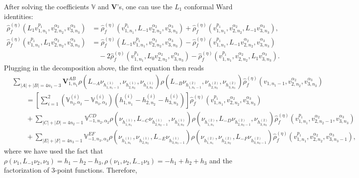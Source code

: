 \documentclass[12pt]{article}
\newcommand{\ie}{\begin{equation}\begin{aligned}}
\newcommand{\fe}{\end{aligned}\end{equation}}
\numberwithin{equation}{section}
\begin{document}
After solving the coefficients $\mathbb{V}$ and $\mathbf{V}$'s, one can use the $L_1$ conformal Ward identities:
\ie
\hat{\rho}_f^{(\eta)}(L_1v^{p_1}_{1,n_1},v_{2,n_2}^{\alpha_2},v_{3,n_3}^{\alpha_3})&=\hat{\rho}_f^{(\eta)}(v^{p_1}_{1,n_1},L_{-1}v_{2,n_2}^{\alpha_2},v_{3,n_3}^{\alpha_3})+\hat{\rho}_f^{(\eta)}(v^{p_1}_{1,n_1},v_{2,n_2}^{\alpha_2},L_{-1}v_{3,n_3}^{\alpha_3}),\\
\hat{\rho}_f^{(\eta)}(v^{p_1}_{1,n_1},L_1v_{2,n_2}^{\alpha_2},v_{3,n_3}^{\alpha_3})&=\hat{\rho}_f^{(\eta)}(L_{-1}v^{p_1}_{1,n_1},v_{2,n_2}^{\alpha_2},v_{3,n_3}^{\alpha_3})-\hat{\rho}_f^{(\eta)}(v^{p_1}_{1,n_1},L_{-1}v_{2,n_2}^{\alpha_2},v_{3,n_3}^{\alpha_3})\\
&\quad -2\hat{\rho}_f^{(\eta)}(v^{p_1}_{1,n_1},L_0v_{2,n_2}^{\alpha_2},v_{3,n_3}^{\alpha_3})-\hat{\rho}_f^{(\eta)}(v^{p_1}_{1,n_1},v_{2,n_2}^{\alpha_2},L_1v_{3,n_3}^{\alpha_3}). 
\fe
Plugging in the decomposition above, the first equation then reads
\ie
&\sum_{|A|+|B|=4n_1-3}\mathbf{V}_{1,n_1}^{AB}\rho(L_{-A}\nu_{h_{1,n_1-1}^{(1)}}, \nu_{h_{2,n_2}^{(1)}}, \nu_{h_{3,n_3}^{(1)}})\rho(L_{-B}\nu_{h_{1,n_1-1}^{(2)}}, \nu_{h_{2,n_2}^{(2)}}, \nu_{h_{3,n_3}^{(2)}})\hat{\rho}_f^{(\eta)}(v_{1,n_1-1},v_{2,n_2}^{\alpha_2},v_{3,n_3}^{\alpha_3})\\
&\qquad = \left[\sum_{i=1}^2 (\mathbb{V}_{n_2,\alpha_2}^{(i)}-\mathbb{V}_{n_3,\alpha_3}^{(i)})(h_{1,n_1}^{(i)}-h_{2,n_2}^{(i)}-h_{3,n_3}^{(i)})\right]\hat{\rho}_f^{(\eta)}(v^{p_1}_{1,n_1}, v_{2, n_2}^{\alpha_2}, v_{3, n_3}^{\alpha_3})\\
&\qquad + \sum_{|C|+|D|=4n_2-1} \mathbb{V}_{-1,n_2, \alpha_2}^{CD}\rho(\nu_{h_{1,n_1}^{(1)}},L_{-C}\nu_{h_{2,n_2-1}^{(1)}}, \nu_{h_{3,n_3}^{(1)}})\rho(\nu_{h_{1,n_1}^{(2)}},L_{-D}\nu_{h_{2,n_2-1}^{(2)}}, \nu_{h_{3,n_3}^{(2)}})\hat{\rho}_f^{(\eta)}(v^{p_1}_{1,n_1},v_{2,n_2-1}^{\alpha_2},v_{3,n_3}^{\alpha_3})\\
&\qquad + \sum_{|E|+|F|=4n_3-1} \mathbb{V}_{-1,n_3, \alpha_3}^{EF}\rho(\nu_{h_{1,n_1}^{(1)}},\nu_{h_{2,n_2}^{(1)}}, L_{-E}\nu_{h_{3,n_3-1}^{(1)}})\rho(\nu_{h_{1,n_1}^{(2)}},\nu_{h_{2,n_2}^{(2)}}, L_{-F}\nu_{h_{3,n_3-1}^{(2)}})\hat{\rho}_f^{(\eta)}(v^{p_1}_{1,n_1},v_{2,n_2}^{\alpha_2},v_{3,n_3-1}^{\alpha_3}),
\fe
where we have used the fact that $\rho(\nu_1,L_{-1}\nu_2,\nu_3)=h_1-h_2-h_3,\rho(\nu_1,\nu_2,L_{-1}\nu_3)=-h_1+h_2+h_3$ and the factorization of 3-point functions. Therefore,
\end{document}
